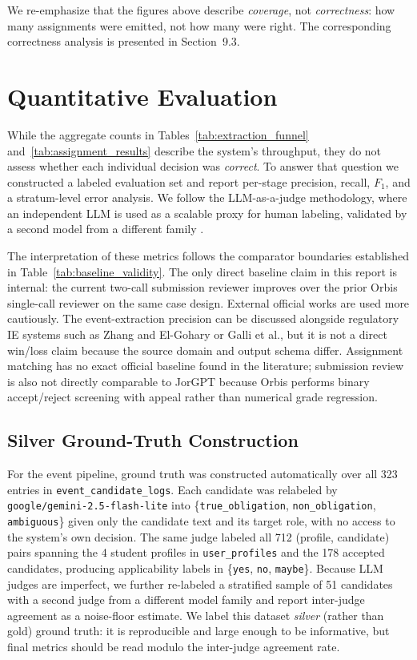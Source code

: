 \documentclass[a4paper,12pt]{article}
\begin{document}
We re-emphasize that the figures above describe \emph{coverage}, not \emph{correctness}: how many assignments were emitted, not how many were right. The corresponding correctness analysis is presented in Section~9.3.

\section{Quantitative Evaluation}
While the aggregate counts in Tables~\ref{tab:extraction_funnel} and~\ref{tab:assignment_results} describe the system's throughput, they do not assess whether each individual decision was \emph{correct}. To answer that question we constructed a labeled evaluation set and report per-stage precision, recall, $F_1$, and a stratum-level error analysis. We follow the LLM-as-a-judge methodology, where an independent LLM is used as a scalable proxy for human labeling, validated by a second model from a different family \cite{zheng2023judging}.

The interpretation of these metrics follows the comparator boundaries established in Table~\ref{tab:baseline_validity}. The only direct baseline claim in this report is internal: the current two-call submission reviewer improves over the prior Orbis single-call reviewer on the same case design. External official works are used more cautiously. The event-extraction precision can be discussed alongside regulatory IE systems such as Zhang and El-Gohary or Galli et al., but it is not a direct win/loss claim because the source domain and output schema differ. Assignment matching has no exact official baseline found in the literature; submission review is also not directly comparable to JorGPT because Orbis performs binary accept/reject screening with appeal rather than numerical grade regression.

\subsection{Silver Ground-Truth Construction}
For the event pipeline, ground truth was constructed automatically over all 323 entries in \texttt{event\_candidate\_logs}. Each candidate was relabeled by \texttt{google/gemini-2.5-flash-lite} into \{\texttt{true\_obligation}, \texttt{non\_obligation}, \texttt{ambiguous}\} given only the candidate text and its target role, with no access to the system's own decision. The same judge labeled all 712 (profile, candidate) pairs spanning the 4 student profiles in \texttt{user\_profiles} and the 178 accepted candidates, producing applicability labels in \{\texttt{yes}, \texttt{no}, \texttt{maybe}\}. Because LLM judges are imperfect, we further re-labeled a stratified sample of 51 candidates with a second judge from a different model family and report inter-judge agreement as a noise-floor estimate. We label this dataset \emph{silver} (rather than gold) ground truth: it is reproducible and large enough to be informative, but final metrics should be read modulo the inter-judge agreement rate.
\end{document}
